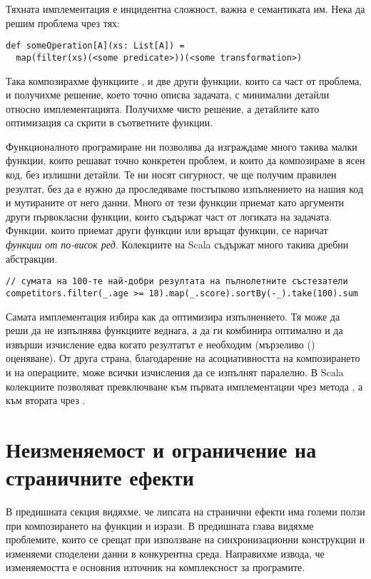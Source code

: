 Тяхната имплементация е инцидентна сложност, важна е семантиката им. Нека да решим проблема чрез тях:

\begin{lstlisting}
def someOperation[A](xs: List[A]) =
  map(filter(xs)(<some predicate>))(<some transformation>)
\end{lstlisting}

Така композирахме функциите ,  и две други функции, които са част от проблема, и получихме решение, което точно описва задачата, с минимални детайли относно имплементацията. Получихме чисто решение, а детайлите като оптимизация са скрити в съответните функции.

Функционалното програмиране ни позволява да изграждаме много такива малки функции, които решават точно конкретен проблем, и които да композираме в ясен код, без излишни детайли. Те ни носят сигурност, че ще получим правилен резултат, без да е нужно да проследяваме постъпково изпълнението на нашия код и мутираните от него данни. Много от тези функции приемат като аргументи други първокласни функции, които съдържат част от логиката на задачата. Функции, които приемат други функции или връщат функции, се наричат \emph{функции от по-висок ред}. Колекциите на Scala съдържат много такива дребни абстракции.

\begin{lstlisting}[texcl=true]
// сумата на 100-те най-добри резултата на пълнолетните състезатели 
competitors.filter(_.age >= 18).map(_.score).sortBy(-_).take(100).sum
\end{lstlisting}

Самата имплементация избира как да оптимизира изпълнението. Тя може да реши да не изпълнява функциите веднага, а да ги комбинира оптимално и да извърши изчисление едва когато резултатът е необходим (мързеливо () оценяване). От друга страна, благодарение на асоциативността на композирането и на операциите, може всички изчисления да се изпълнят паралелно. В Scala колекциите позволяват превключване към първата имплементации чрез метода , а към втората чрез .

\section{Неизменяемост и ограничение на страничните ефекти}
\label{sec:immutability}

В предишната секция видяхме, че липсата на странични ефекти има големи ползи при композирането на функции и изрази. В предишната глава видяхме проблемите, които се срещат при използване на синхронизационни конструкции и изменяеми споделени данни в конкурентна среда. Направихме извода, че изменяемостта е основния източник на комплексност за програмите.

